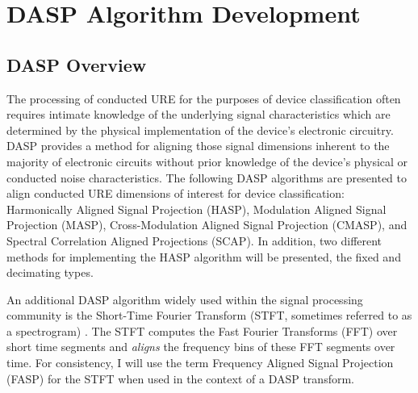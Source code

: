 
\chapter{DASP Algorithm Development}
\label{DASP Algorithm Development Chapter}

\section[DASP Overview]{DASP Overview}

The processing of conducted URE for the purposes of device classification often requires intimate knowledge of the underlying signal characteristics which are determined by the physical implementation of the device's electronic circuitry.  DASP provides a method for aligning those signal dimensions inherent to the majority of electronic circuits without prior knowledge of the device's physical or conducted noise characteristics.  The following DASP algorithms are presented to align conducted URE dimensions of interest for device classification: Harmonically Aligned Signal Projection (HASP), Modulation Aligned Signal Projection (MASP), Cross-Modulation Aligned Signal Projection (CMASP), and Spectral Correlation Aligned Projections (SCAP).   In addition, two different methods for implementing the HASP algorithm will be presented, the fixed and decimating types.

An additional DASP algorithm widely used within the signal processing community is the Short-Time Fourier Transform (STFT, sometimes referred to as a spectrogram) \cite{Welch1967, Allen1977, Griffin1984}.  The STFT computes the Fast Fourier Transforms (FFT) over short time segments and \textit{aligns} the frequency bins of these FFT segments over time.  For consistency, I will use the term Frequency Aligned Signal Projection (FASP) for the STFT when used in the context of a DASP transform.   

